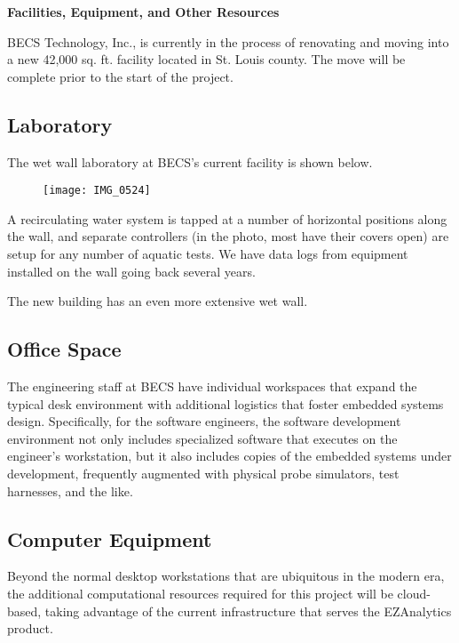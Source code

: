\documentclass[11pt]{article}
\begin{document}
\pagestyle{plain}
\thispagestyle{plain}

\begin{center}
\textbf{\Large Facilities, Equipment, and Other Resources}
\end{center}

BECS Technology, Inc., is currently in the process of renovating
and moving into a new 42,000 sq. ft. facility located in
St. Louis county.
The move will be complete prior to the start of the project.

\subsection*{Laboratory}

The wet wall laboratory at BECS's current facility is shown below.

\begin{figure}[h]
 \center
\texttt{[image: IMG\_0524]}
\end{figure}

A recirculating water system is tapped at a number of horizontal
positions along the wall, and separate controllers (in the photo,
most have their covers open) are setup for any number of aquatic tests.
We have data logs from equipment installed on the wall going back
several years.

The new building has an even more extensive wet wall.

\subsection*{Office Space}

The engineering staff at BECS have individual workspaces that
expand the typical desk environment with additional logistics
that foster embedded systems design.
Specifically, for the software engineers, the software development
environment not only includes specialized software that executes
on the engineer’s workstation, but it also includes copies of
the embedded systems under development, frequently augmented with
physical probe simulators, test harnesses, and the like.

\subsection*{Computer Equipment}

Beyond the normal desktop workstations that are ubiquitous in
the modern era, the additional computational resources required
for this project will be cloud-based, taking advantage of the current
infrastructure that serves the EZAnalytics\texttrademark{} product.
\end{document}
